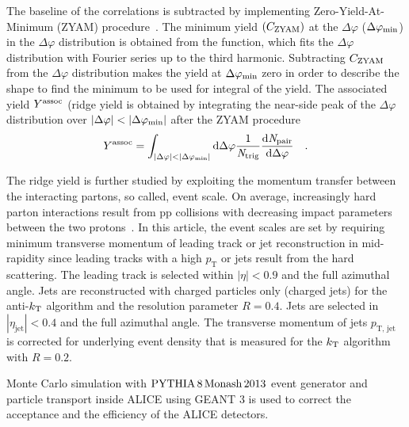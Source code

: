 The baseline of the correlations is subtracted by implementing Zero-Yield-At-Minimum (ZYAM) procedure~\cite{Ajitanand:2005jj}. The minimum yield $(C_{\rm{ZYAM}})$ at the $\Delta\varphi$ ($\Delta\varphi_{\rm{min}}$) in the $\Delta\varphi$ distribution is obtained from the function, which fits the $\Delta\varphi$ distribution with Fourier series up to the third harmonic. Subtracting $C_{\rm{ZYAM}}$ from the $\Delta\varphi$ distribution makes the yield at $\Delta\varphi_{\rm{min}}$ zero in order to describe the shape to find the minimum to be used for integral of the yield. The associated yield $Y^{\rm{assoc}}$ (ridge yield is obtained by integrating the near-side peak of the $\Delta\varphi$ distribution over $|\Delta\varphi|<|\Delta\varphi_{\rm{min}}|$ after the ZYAM procedure
\begin{eqnarray}
Y^{\rm{assoc}} = \int_{|\Delta \varphi| < |\Delta\varphi_{\rm{min}}| } \rm{d} \Delta\varphi \frac{1}{\it{N}_{\rm{trig}}} \frac{ \rm{d}\it{}N_{\rm{pair}} }{ \rm{d}\Delta\varphi } \quad.
\end{eqnarray}

The ridge yield is further studied by exploiting the momentum transfer between the interacting partons, so called, event scale. On average, increasingly hard parton interactions result from pp collisions with decreasing impact parameters between the two protons~\cite{Sjostrand:1986ep,Frankfurt:2010ea}.
In this article, the event scales are set by requiring minimum transverse momentum of leading track or jet reconstruction in mid-rapidity since leading tracks with a high $p_\mathrm{T}$ or jets result from the hard scattering. The leading track is selected within $|\eta|<0.9$ and the full azimuthal angle. Jets are reconstructed with charged particles only (charged jets) for the anti-$k_{\rm{T}}$ algorithm and the resolution parameter $R = 0.4$. Jets are selected in $|\eta_\mathrm{jet}|<0.4$ and the full azimuthal angle. The transverse momentum of jets $p_\mathrm{T,\,jet}$ is corrected for underlying event density that is measured for the $k_{\rm{T}}$ algorithm with $R = 0.2$. 

Monte Carlo simulation with $\mathrm{PYTHIA}\,8\,\mathrm{Monash}\,2013$ event generator and particle transport inside ALICE using GEANT 3 is used to correct the acceptance and the efficiency of the ALICE detectors. 



